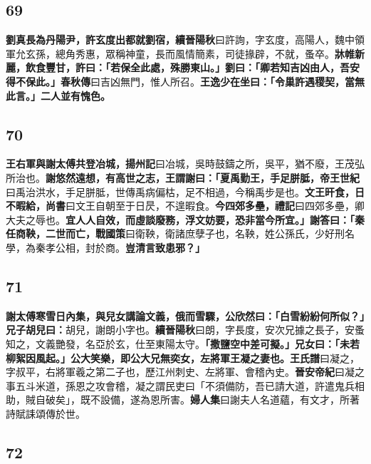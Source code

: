 \subsection*{69}

\textbf{劉真長為丹陽尹，許玄度出都就劉宿，}{\footnotesize \textbf{續晉陽秋}曰許詢，字玄度，高陽人，魏中領軍允玄孫，總角秀惠，眾稱神童，長而風情簡素，司徒掾辟，不就，蚤卒。}\textbf{牀帷新麗，飲食豐甘，許曰：「若保全此處，殊勝東山。」劉曰：「卿若知吉凶由人，吾安得不保此。」}{\footnotesize \textbf{春秋傳}曰吉凶無門，惟人所召。}\textbf{王逸少在坐曰：「令巢許遇稷契，當無此言。」二人並有愧色。}

\subsection*{70}

\textbf{王右軍與謝太傅共登冶城，}{\footnotesize \textbf{揚州記}曰冶城，吳時鼓鑄之所，吳平，猶不廢，王茂弘所治也。}\textbf{謝悠然遠想，有高世之志，王謂謝曰：「夏禹勤王，手足胼胝，}{\footnotesize \textbf{帝王世紀}曰禹治洪水，手足胼胝，世傳禹病偏枯，足不相過，今稱禹步是也。}\textbf{文王旰食，日不暇給，}{\footnotesize \textbf{尚書}曰文王自朝至于日昃，不遑暇食。}\textbf{今四郊多壘，}{\footnotesize \textbf{禮記}曰四郊多壘，卿大夫之辱也。}\textbf{宜人人自效，而虛談廢務，浮文妨要，恐非當今所宜。」謝答曰：「秦任商鞅，二世而亡，}{\footnotesize \textbf{戰國策}曰衛鞅，衛諸庶孽子也，名鞅，姓公孫氏，少好刑名學，為秦孝公相，封於商。}\textbf{豈清言致患邪？」}

\subsection*{71}

\textbf{謝太傅寒雪日內集，與兒女講論文義，俄而雪驟，公欣然曰：「白雪紛紛何所似？」兄子胡兒曰：}{\footnotesize 胡兒，謝朗小字也。\textbf{續晉陽秋}曰朗，字長度，安次兄據之長子，安蚤知之，文義艷發，名亞於玄，仕至東陽太守。}\textbf{「撒鹽空中差可擬。」兄女曰：「未若柳絮因風起。」公大笑樂，即公大兄無奕女，左將軍王凝之妻也。}{\footnotesize \textbf{王氏譜}曰凝之，字叔平，右將軍羲之第二子也，歷江州刺史、左將軍、會稽內史。\textbf{晉安帝紀}曰凝之事五斗米道，孫恩之攻會稽，凝之謂民吏曰「不須備防，吾已請大道，許遣鬼兵相助，賊自破矣」，既不設備，遂為恩所害。\textbf{婦人集}曰謝夫人名道蘊，有文才，所著詩賦誄頌傳於世。}

\subsection*{72}

